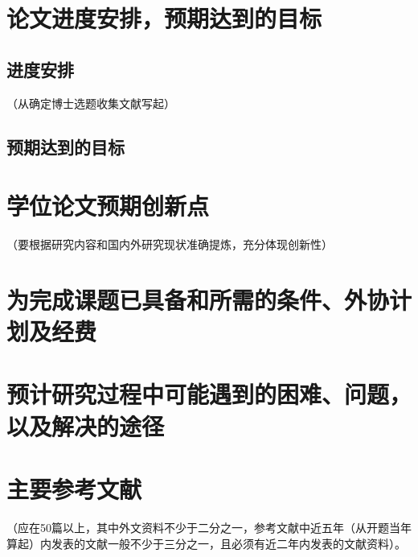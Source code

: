 \documentclass[proposal]{sysuthesis}
\begin{document}
\section{论文进度安排，预期达到的目标}
\subsection{进度安排}
（从确定博士选题收集文献写起）
\subsection{预期达到的目标}

\section{学位论文预期创新点}
（要根据研究内容和国内外研究现状准确提炼，充分体现创新性）

\section{为完成课题已具备和所需的条件、外协计划及经费}

\section{预计研究过程中可能遇到的困难、问题，以及解决的途径}

\section{主要参考文献}
（应在50篇以上，其中外文资料不少于二分之一，参考文献中近五年（从开题当年算起）内发表的文献一般不少于三分之一，且必须有近二年内发表的文献资料）。




\cleardoublepage
\end{document}

